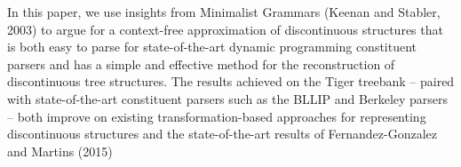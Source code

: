 In this paper, we use insights from Minimalist Grammars (Keenan and Stabler, 2003) to argue for a context-free approximation of discontinuous structures that is both easy to parse for state-of-the-art dynamic programming constituent parsers and has a simple and effective method for the reconstruction of discontinuous tree structures. The results achieved on the Tiger treebank -- paired with state-of-the-art constituent parsers such as the BLLIP and Berkeley parsers -- both improve on existing transformation-based approaches for representing discontinuous structures and the state-of-the-art results of Fernandez-Gonzalez and Martins (2015)
